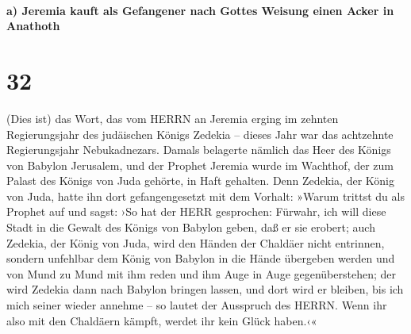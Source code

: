 \hypertarget{a-jeremia-kauft-als-gefangener-nach-gottes-weisung-einen-acker-in-anathoth}{%
\paragraph{a) Jeremia kauft als Gefangener nach Gottes Weisung einen
Acker in
Anathoth}\label{a-jeremia-kauft-als-gefangener-nach-gottes-weisung-einen-acker-in-anathoth}}

\hypertarget{section-31}{%
\section{32}\label{section-31}}

(Dies ist) das Wort, das vom HERRN an Jeremia erging im
zehnten Regierungsjahr des judäischen Königs Zedekia -- dieses Jahr war
das achtzehnte Regierungsjahr Nebukadnezars. Damals
belagerte nämlich das Heer des Königs von Babylon Jerusalem, und der
Prophet Jeremia wurde im Wachthof, der zum Palast des Königs von Juda
gehörte, in Haft gehalten. Denn Zedekia, der König von
Juda, hatte ihn dort gefangengesetzt mit dem Vorhalt: »Warum trittst du
als Prophet auf und sagst: ›So hat der HERR gesprochen: Fürwahr, ich
will diese Stadt in die Gewalt des Königs von Babylon geben, daß er sie
erobert; auch Zedekia, der König von Juda, wird den Händen
der Chaldäer nicht entrinnen, sondern unfehlbar dem König von Babylon in
die Hände übergeben werden und von Mund zu Mund mit ihm reden und ihm
Auge in Auge gegenüberstehen; der wird Zedekia dann nach
Babylon bringen lassen, und dort wird er bleiben, bis ich mich seiner
wieder annehme -- so lautet der Ausspruch des HERRN. Wenn ihr also mit
den Chaldäern kämpft, werdet ihr kein Glück haben.‹«

